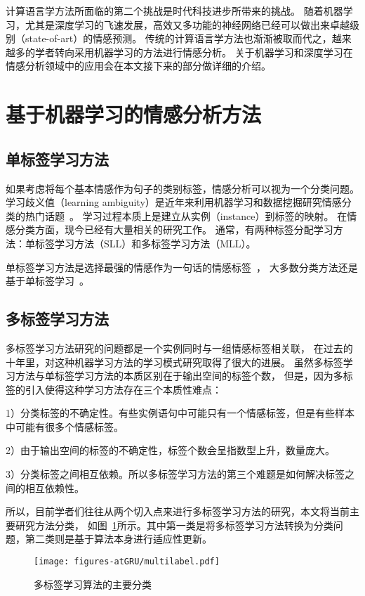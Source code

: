 计算语言学方法所面临的第二个挑战是时代科技进步所带来的挑战。
随着机器学习，尤其是深度学习的飞速发展，高效又多功能的神经网络已经可以做出来卓越级别（state-of-art）的情感预测。
传统的计算语言学方法也渐渐被取而代之，越来越多的学者转向采用机器学习的方法进行情感分析。
关于机器学习和深度学习在情感分析领域中的应用会在本文接下来的部分做详细的介绍。

\section{基于机器学习的情感分析方法}
\subsection{单标签学习方法}
如果考虑将每个基本情感作为句子的类别标签，情感分析可以视为一个分类问题。
学习歧义值（learning ambiguity）是近年来利用机器学习和数据挖掘研究情感分类的热门话题~。
学习过程本质上是建立从实例（instance）到标签的映射。
在情感分类方面，现今已经有大量相关的研究工作。
通常，有两种标签分配学习方法：单标签学习方法（SLL）和多标签学习方法（MLL）。

单标签学习方法是选择最强的情感作为一句话的情感标签~，
大多数分类方法还是基于单标签学习~。

\subsection{多标签学习方法}
多标签学习方法研究的问题都是一个实例同时与一组情感标签相关联，
在过去的十年里，对这种机器学习方法的学习模式研究取得了很大的进展。
虽然多标签学习方法与单标签学习方法的本质区别在于输出空间的标签个数，
但是，因为多标签的引入使得这种学习方法存在三个本质性难点：

1）分类标签的不确定性。有些实例语句中可能只有一个情感标签，但是有些样本中可能有很多个情感标签。

2）由于输出空间的标签的不确定性，标签个数会呈指数型上升，数量庞大。

3）分类标签之间相互依赖。所以多标签学习方法的第三个难题是如何解决标签之间的相互依赖性。

所以，目前学者们往往从两个切入点来进行多标签学习方法的研究，本文将当前主要研究方法分类，
如图~\ref{fig:multilabel}所示。其中第一类是将多标签学习方法转换为分类问题，第二类则是基于算法本身进行适应性更新。

\begin{figure}[h]
    \centering
    \texttt{[image: figures-atGRU/multilabel.pdf]}
    \caption{多标签学习算法的主要分类}
    \label{fig:multilabel}
\end{figure}

